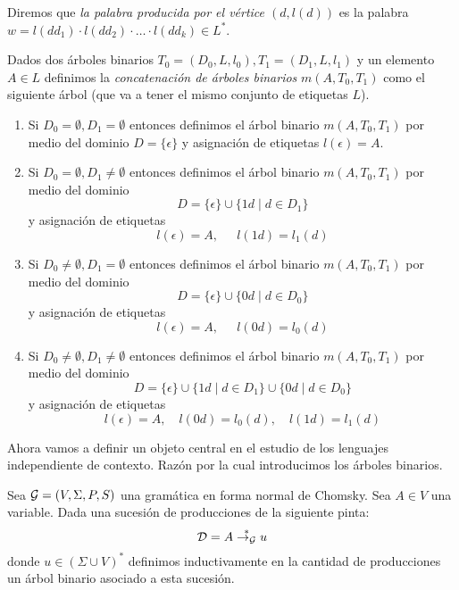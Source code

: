 \documentclass[tesis.tex]{subfiles}
\begin{document}
\begin{leoenv}
\begin{deff}
	Diremos que \emph{la palabra producida por el vértice $(d,l(d))$} es la palabra 
	$w = l(dd_{1}) \cdot l(dd_{2}) \cdot \dots \cdot l(dd_{k}) \in L^{*}$.
\end{deff}

\begin{deff}
	Dados dos árboles binarios $T_{0} = (D_{0}, L, l_{0}), T_{1} =(D_{1},L,l_{1})$ y un elemento $A \in L$ definimos la \emph{concatenación de árboles binarios} $m(A,T_{0},T_{1})$ como el siguiente árbol (que va a tener el mismo conjunto de etiquetas $L$).
	\begin{enumerate}
		\item Si $D_{0} = \emptyset, D_{1} = \emptyset$ entonces definimos el árbol binario $m(A,T_{0},T_{1})$ por medio del dominio 
		$D = \{ \epsilon \}$ y asignación de etiquetas $l(\epsilon) = A$.

		\item Si $D_{0} = \emptyset, D_{1} \neq \emptyset$ entonces definimos el árbol binario $m(A,T_{0},T_{1})$ por medio del dominio  
		\[
			D = \{ \epsilon \} \cup \{ 1d \mid d \in D_{1} \}
		\]
		y asignación de etiquetas
		\[
			l(\epsilon) = A, \ \ \quad l(1d) = l_{1}(d)
		\]

		\item Si $D_{0} \neq \emptyset, D_{1} = \emptyset$ entonces definimos el árbol binario $m(A,T_{0},T_{1})$ por medio del dominio  
		\[
			D = \{ \epsilon \} \cup \{ 0d \mid d \in D_{0} \}
		\]
		y asignación de etiquetas
		\[
			l(\epsilon) = A, \ \ \quad l(0d) = l_{0}(d)
		\]

		\item Si $D_{0} \neq \emptyset, D_{1} \neq \emptyset$ entonces definimos el árbol binario $m(A,T_{0},T_{1})$ por medio del dominio
		\[
			D = \{ \epsilon \} \cup \{ 1d \mid d \in D_{1} \} \cup \{ 0d \mid d \in D_{0} \}
		\]
		y asignación de etiquetas
		\[
			l(\epsilon) = A, \quad l(0d) = l_{0}(d), \quad  l(1d) = l_{1}(d)
		\]
	\end{enumerate}
\end{deff}

Ahora vamos a definir un objeto central en el estudio de los lenguajes independiente de contexto.
Razón por la cual introducimos los árboles binarios.

Sea ${\cal G} = (V, \Sigma, P, S)$ una gramática \ic{} en forma normal de Chomsky.
Sea $A \in V$ una variable.
Dada una sucesión de producciones de la siguiente pinta:
\[
	{\cal D} =  A \overset{*}{\to_{\cal G}} u
\]
donde $u \in (\Sigma \cup V)^{*}$ definimos inductivamente en la cantidad de producciones un árbol binario asociado a esta sucesión.


\end{leoenv}
\end{document}
